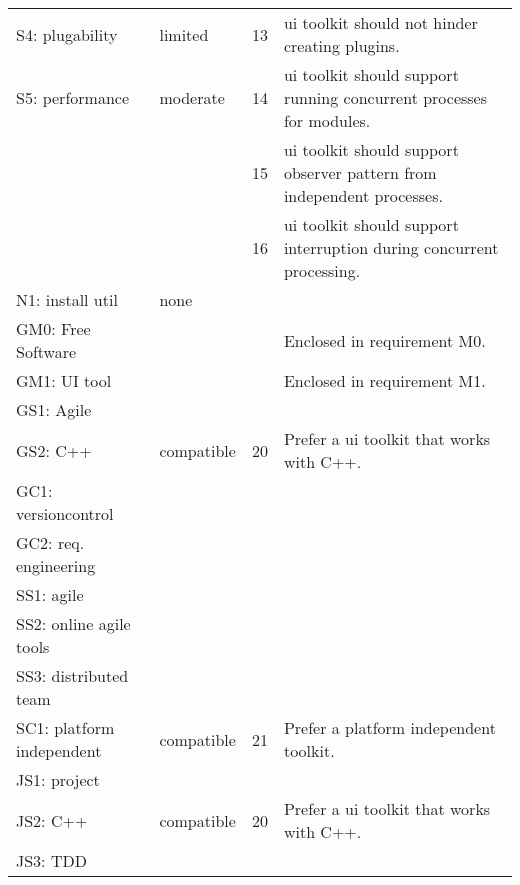 \begin{center}
\begin{longtable}{ll||cp{21em}}
        S4: plugability      & limited      & 13  & ui toolkit should not hinder creating plugins.\\
        S5: performance	     & moderate     & 14  & ui toolkit should support running concurrent processes for modules.\\
	                         &              & 15  & ui toolkit should support observer pattern from independent processes.\\
	                         &              & 16  & ui toolkit should support interruption during concurrent processing.\\
        N1: install util     & none    		&     & \\\hline
		GM0: Free Software  &              &     & Enclosed in requirement M0.\\
        GM1: UI tool	    &              &     & Enclosed in requirement M1.\\
        GS1: Agile	        &              &     & \\
        GS2: C++	        & compatible   & 20  & Prefer a ui toolkit that works with C++.\\
        GC1: versioncontrol &              &     & \\
        GC2: req. engineering
						    &              &     & \\\hline
        SS1: agile	        &              &     & \\
        SS2: online agile tools
							&              &     & \\
        SS3: distributed team
							&              &     & \\
        SC1: platform independent
							& compatible   & 21  & Prefer a platform independent toolkit.\\\hline
		JS1: project        &              &     & \\
        JS2: C++	        & compatible   & 20  & Prefer a ui toolkit that works with C++.\\
		JS3: TDD			&              &     & \\
    \end{longtable}
    \label{tab:uitool-requirements}
\end{center}
